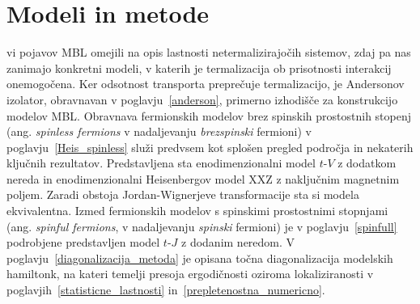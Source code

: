 \chapter{Modeli in metode}\label{modelimetode}
vi pojavov MBL omejili na opis lastnosti netermalizirajočih sistemov, zdaj pa nas zanimajo konkretni modeli, v katerih je termalizacija ob prisotnosti interakcij onemogočena. Ker odsotnost transporta preprečuje termalizacijo, je Andersonov izolator, obravnavan v poglavju~\ref{anderson}, primerno izhodišče za konstrukcijo modelov MBL. Obravnava fermionskih modelov brez spinskih prostostnih stopenj (ang. \emph{spinless fermions} v nadaljevanju \emph{brezspinski} fermioni) v poglavju~\ref{Heis_spinless} služi predvsem kot splošen pregled področja in nekaterih ključnih rezultatov. Predstavljena sta enodimenzionalni model $t$-$V$ z dodatkom nereda in enodimenzionalni Heisenbergov model XXZ z naključnim magnetnim poljem. Zaradi obstoja Jordan-Wignerjeve transformacije sta si modela ekvivalentna.
Izmed fermionskih modelov s spinskimi prostostnimi stopnjami (ang. \emph{spinful fermions}, v nadaljevanju \emph{spinski} fermioni) je v poglavju~\ref{spinfull} podrobjene predstavljen model $t$-$J$ z dodanim neredom. 
V poglavju~\ref{diagonalizacija_metoda} je opisana točna diagonalizacija modelskih hamiltonk, na kateri temelji presoja ergodičnosti oziroma lokaliziranosti v poglavjih~\ref{statisticne_lastnosti} in~\ref{prepletenostna_numericno}.
